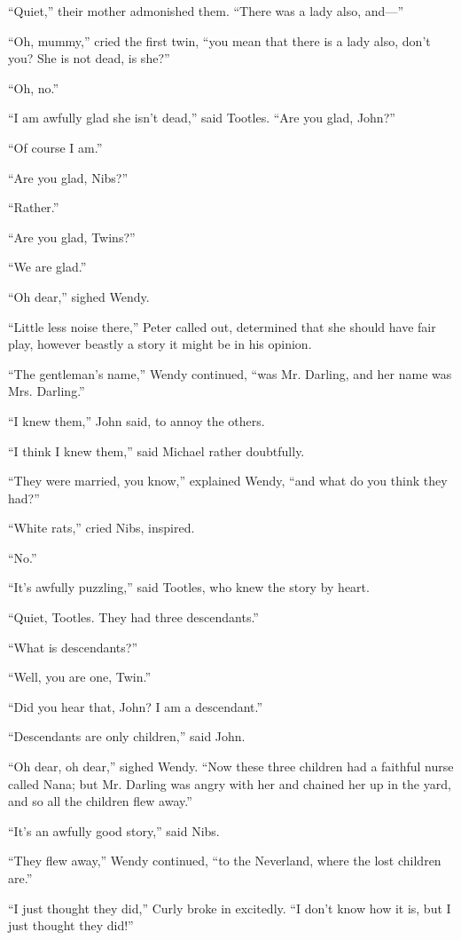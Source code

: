 ``Quiet,'' their mother admonished them. ``There was a lady also, and—''

``Oh, mummy,'' cried the first twin, ``you mean that there is a lady also,
don't you? She is not dead, is she?''

``Oh, no.''

``I am awfully glad she isn't dead,'' said Tootles. ``Are you glad, John?''

``Of course I am.''

``Are you glad, Nibs?''

``Rather.''

``Are you glad, Twins?''

``We are glad.''

``Oh dear,'' sighed Wendy.

``Little less noise there,'' Peter called out, determined that she should
have fair play, however beastly a story it might be in his opinion.

``The gentleman's name,'' Wendy continued, ``was Mr. Darling, and her name
was Mrs. Darling.''

``I knew them,'' John said, to annoy the others.

``I think I knew them,'' said Michael rather doubtfully.

``They were married, you know,'' explained Wendy, ``and what do you think
they had?''

``White rats,'' cried Nibs, inspired.

``No.''

``It's awfully puzzling,'' said Tootles, who knew the story by heart.

``Quiet, Tootles. They had three descendants.''

``What is descendants?''

``Well, you are one, Twin.''

``Did you hear that, John? I am a descendant.''

``Descendants are only children,'' said John.

``Oh dear, oh dear,'' sighed Wendy. ``Now these three children had a
faithful nurse called Nana; but Mr. Darling was angry with her and
chained her up in the yard, and so all the children flew away.''

``It's an awfully good story,'' said Nibs.

``They flew away,'' Wendy continued, ``to the Neverland, where the lost
children are.''

``I just thought they did,'' Curly broke in excitedly. ``I don't know how
it is, but I just thought they did!''


